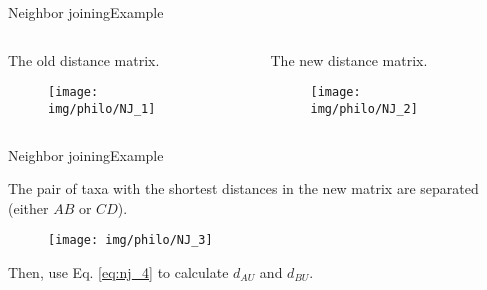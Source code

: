 \documentclass[10pt]{beamer}
\newcommand{\1}{
	\setbeamertemplate{background}{
		\texttt{[image: img/1]}
		\tikz[overlay] \fill[fill opacity=0.75,fill=white] (0,0) rectangle (-\paperwidth,\paperheight);
	}
}
\begin{document}
\begin{frame}{Neighbor joining}{Example}
	\begin{columns}
		\begin{column}{0.48\textwidth}
			The old distance matrix.
			\begin{figure}
				\texttt{[image: img/philo/NJ\_1]}
			\end{figure}
		\end{column}
		\begin{column}{0.48\textwidth}
			The new distance matrix.
			\begin{figure}
				\texttt{[image: img/philo/NJ\_2]}
			\end{figure}		
		\end{column}
	\end{columns}
\end{frame}

\begin{frame}{Neighbor joining}{Example}

	The pair of taxa with the shortest distances in the new matrix are separated (either $AB$ or $CD$).
	
	\begin{figure}
		\texttt{[image: img/philo/NJ\_3]}
	\end{figure}

	Then, use Eq. \ref{eq:nj_4} to calculate $d_{AU}$ and $d_{BU}$.
	
\end{frame}
\end{document}
